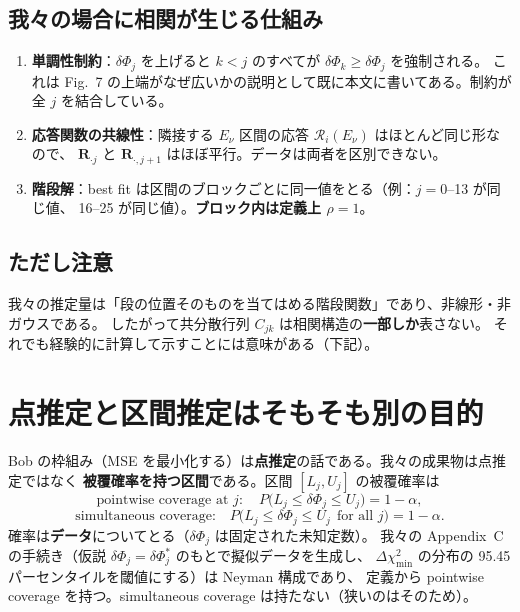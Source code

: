 \documentclass[11pt,a4paper]{ltjsarticle}
\newcommand{\dP}{\delta\Phi}
\newcommand{\Ev}{E_\nu}
\begin{document}
\subsection*{我々の場合に相関が生じる仕組み}
\begin{enumerate}\itemsep2pt
\item \textbf{単調性制約}：$\dP_j$ を上げると $k<j$ のすべてが $\dP_k\ge\dP_j$ を強制される。
これは Fig.~7 の上端がなぜ広いかの説明として既に本文に書いてある。制約が全 $j$ を結合している。
\item \textbf{応答関数の共線性}：隣接する $\Ev$ 区間の応答 $\mathcal{R}_i(\Ev)$ はほとんど同じ形なので、
$\bm R_{\cdot j}$ と $\bm R_{\cdot,j+1}$ はほぼ平行。データは両者を区別できない。
\item \textbf{階段解}：best fit は区間のブロックごとに同一値をとる（例：$j=0$--13 が同じ値、
16--25 が同じ値）。\textbf{ブロック内は定義上 $\rho=1$}。
\end{enumerate}

\subsection*{ただし注意}
我々の推定量は「段の位置そのものを当てはめる階段関数」であり、非線形・非ガウスである。
したがって共分散行列 $C_{jk}$ は相関構造の\textbf{一部しか}表さない。
それでも経験的に計算して示すことには意味がある（下記）。

\section{点推定と区間推定はそもそも別の目的}

Bob の枠組み（MSE を最小化する）は\textbf{点推定}の話である。我々の成果物は点推定ではなく
\textbf{被覆確率を持つ区間}である。区間 $[L_j,U_j]$ の被覆確率は
\begin{equation}
\text{pointwise coverage at }j:\quad P\big(L_j\le \dP_j\le U_j\big)=1-\alpha,
\end{equation}
\begin{equation}
\text{simultaneous coverage:}\quad P\big(L_j\le \dP_j\le U_j\ \ \text{for all }j\big)=1-\alpha .
\end{equation}
確率は\textbf{データ}についてとる（$\dP_j$ は固定された未知定数）。
我々の Appendix~C の手続き（仮説 $\dP_j=\dP_j^*$ のもとで擬似データを生成し、
$\Delta\chi^2_{\min}$ の分布の 95.45 パーセンタイルを閾値にする）は Neyman 構成であり、
定義から pointwise coverage を持つ。simultaneous coverage は持たない（狭いのはそのため）。
\end{document}
